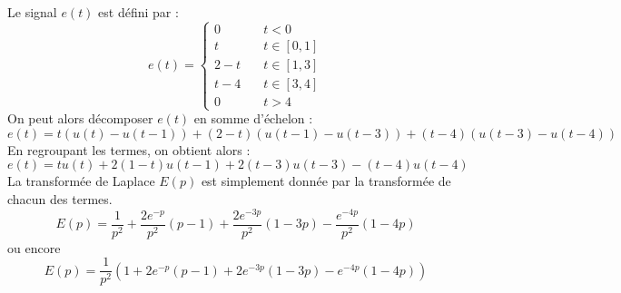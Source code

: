 
\question{}
Le signal $e(t)$ est défini par :
\[
e(t)=\begin{cases}
    0&\quad t<0 \\
    t&\quad t\in[0,1]\\
    2-t&\quad t\in[1,3]\\
    t-4&\quad t\in[3,4]\\
    0&\quad t>4
     \end{cases}
\]
On peut alors décomposer $e(t)$ en somme d'échelon :
\[
    e(t)=t    \left(u(t)-u(t-1)  \right)+(2-t)\left(u(t-1)-u(t-3)\right)+
         (t-4)\left(u(t-3)-u(t-4)\right) 
\]
En regroupant les termes, on obtient alors :
\[
    e(t)=tu(t)+2(1-t)u(t-1)+2(t-3)u(t-3)-(t-4)u(t-4)
\]
\question{}
La transformée de Laplace $E(p)$ est simplement donnée par la transformée de
chacun des termes.
\[
    E(p)=\dfrac{1}{p^2}+\dfrac{2e^{-p}}{p^2}\left(p-1\right)
                       +\dfrac{2e^{-3p}}{p^2}\left(1-3p\right)
                       -\dfrac{e^{-4p}}{p^2}\left(1-4p\right)
\]
ou encore
\[
    E(p)=\dfrac{1}{p^2}\left(1+2e^{-p}(p-1)+2e^{-3p}(1-3p)-e^{-4p}(1-4p)\right)
\]

